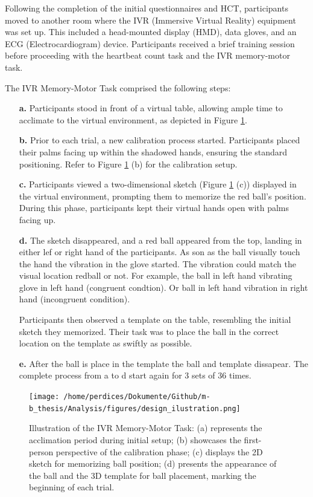 \documentclass[12pt,oneside,openright]{report}
\begin{document}
Following the completion of the initial questionnaires and HCT, participants moved to another room where the IVR (Immersive Virtual Reality) equipment was set up. This included a head-mounted display (HMD), data gloves, and an ECG (Electrocardiogram) device. Participants received a brief training session before proceeding with the heartbeat count task and the IVR memory-motor task.


The IVR Memory-Motor Task comprised the following steps:
\begin{enumerate}
    \item[\textbf{a.}] Participants stood in front of a virtual table, allowing ample time to acclimate to the virtual environment, as depicted in Figure \ref{fig:looks}.
    
    \item[\textbf{b.}] Prior to each trial, a new calibration process started. Participants placed their palms facing up within the shadowed hands, ensuring the standard positioning. Refer to Figure \ref{fig:looks} (b) for the calibration setup.
    
    \item[\textbf{c.}] Participants viewed a two-dimensional sketch (Figure \ref{fig:looks} (c)) displayed in the virtual environment, prompting them to memorize the red ball's position. During this phase, participants kept their virtual hands open with palms facing up.
    
    \item[\textbf{d.}] The sketch disappeared, and a red ball appeared from the top, landing in either lef or right hand of the participants. As son as the ball visually touch the hand the vibration in the glove started. The vibration could match the visual location redball or not. For example, the ball in left hand vibrating glove in left hand (congruent condtion). Or ball in left hand vibration in right hand (incongruent condition). 
    
    Participants then observed a template on the table, resembling the initial sketch they memorized. Their task was to place the ball in the correct location on the template as swiftly as possible.

    \item[\textbf{e.}] After the ball is place in the template the ball and template dissapear. The complete process from a to d start again for 3 sets of 36 times. 
    
\end{enumerate}

\begin{figure}[!ht]
    \centering
    \texttt{[image: /home/perdices/Dokumente/Github/m-b\_thesis/Analysis/figures/design\_ilustration.png]}
    \caption{Illustration of the IVR Memory-Motor Task: (a) represents the acclimation period during initial setup; (b) showcases the first-person perspective of the calibration phase; (c) displays the 2D sketch for memorizing ball position; (d) presents the appearance of the ball and the 3D template for ball placement, marking the beginning of each trial.}
    \label{fig:looks}
\end{figure}
 
\end{document}
